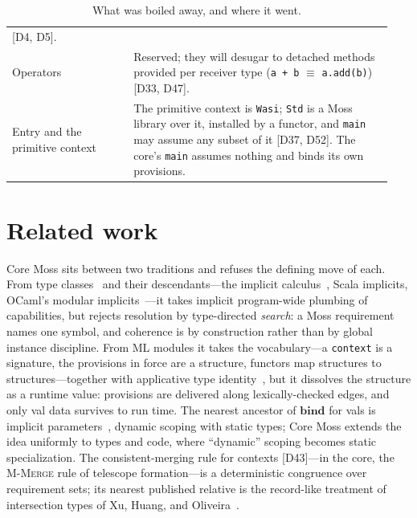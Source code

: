 \documentclass[10pt]{article}
\newcommand{\kw}[1]{\mathbf{#1}}          %
\theoremstyle{plain}
\theoremstyle{remark}
\begin{document}
\begin{table}[h]
\begin{tabular}{@{}p{0.30\linewidth}p{0.64\linewidth}@{}}
[D4, D5]. \\[3pt]
Operators &
Reserved; they will desugar to detached methods provided per receiver
type (\texttt{a + b} $\equiv$ \texttt{a.add(b)}) [D33, D47]. \\[3pt]
Entry and the primitive context &
The primitive context is \texttt{Wasi}; \texttt{Std} is a Moss library
over it, installed by a functor, and \texttt{main} may assume any subset
of it [D37, D52]. The core's \texttt{main} assumes nothing and binds its
own provisions. \\
\bottomrule
\end{tabular}
\caption{What was boiled away, and where it went.}
\label{tab:full}
\end{table}

\section{Related work}\label{sec:related}

Core Moss sits between two traditions and refuses the defining move of
each. From type classes~\cite{wadler-blott} and their descendants---the
implicit calculus~\cite{implicit-calculus}, Scala implicits, OCaml's
modular implicits~\cite{modular-implicits}---it takes implicit
program-wide plumbing of capabilities, but rejects resolution by
type-directed \emph{search}: a Moss requirement names one symbol, and
coherence is by construction rather than by global instance discipline.
From ML modules it takes the vocabulary---a \texttt{context} is a
signature, the provisions in force are a structure, functors map
structures to structures---together with applicative type
identity~\cite{leroy-applicative}, but it dissolves the structure as a
runtime value: provisions are delivered along lexically-checked edges,
and only val data survives to run time. The nearest ancestor of
$\kw{bind}$ for vals is implicit parameters~\cite{implicit-params},
dynamic scoping with static types; Core Moss extends the idea uniformly
to types and code, where ``dynamic'' scoping becomes static
specialization. The consistent-merging rule for contexts [D43]---in the core, the
\textsc{M-Merge} rule of telescope formation---is a deterministic
congruence over requirement sets;
its nearest published relative is the record-like treatment of
intersection types of Xu, Huang, and Oliveira~\cite{type-difference}.
\end{document}
